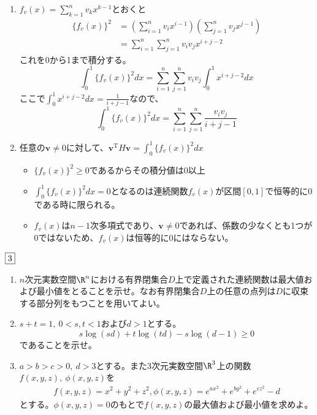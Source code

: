 \documentclass[dvipdfmx]{jsreport}
\begin{document}
\begin{souanswer}
\begin{enumerate}
	\item $f_v(x)= \sum_{k= 1}^n v_kx^{k- 1}$とおくと
\begin{align*}
	\{f_v(x)\}^2
	&= \left(\sum_{i= 1}^n v_ix^{i- 1}\right)\left(\sum_{j= 1}^n v_jx^{j- 1}\right)\\
	&= \sum_{i= 1}^n\sum_{j= 1}^n v_iv_j x^{i+ j- 2}
\end{align*}
	これを0から1まで積分する。
\begin{equation*}
	\int_0^1\{f_v(x)\}^2 dx= \sum_{i= 1}^n \sum_{j= 1}^n v_iv_j \int_0^1 x^{i+ j-2} dx
\end{equation*}
	ここで$\int_0^1 x^{i+ j- 2} dx= \frac{1}{i+ j- 1}$なので、
\begin{equation*}
	\int_0^1\{f_v(x)\}^2 dx= \sum_{i= 1}^n \sum_{j= 1}^n\frac{v_iv_j}{i+ j- 1}
\end{equation*}

	\item 任意の$\bm{v}\ne 0$に対して、$\bm{v}^\mathrm{T}H\bm{v}= \int_0^1 \{f_v(x)\}^2 dx$
\begin{itemize}
	\item $\{f_v(x)\}^2\ge 0$であるからその積分値は0以上
	\item  $\int_0^1 \{f_v(x)\}^2 dx= 0$となるのは連続関数$f_v(x)$が区間$[0, 1]$で恒等的に0である時に限られる。
	\item $f_v(x)$は$n- 1$次多項式であり、$\bm{v}\ne 0$であれば、係数の少なくとも1つが0ではないため、$f_v(x)$は恒等的に0にはならない。
\end{itemize}


\end{enumerate}
\end{souanswer}

\begin{tcolorbox} %
	$\fbox{3}$
\begin{enumerate}
	\item $n$次元実数空間$\R^n$における有界閉集合$D$上で定義された連続関数は最大値および最小値をとることを示せ。なお有界閉集合$D$上の任意の点列は$D$に収束する部分列をもつことを用いてよい。
	\item $s+ t= 1,\ 0< s, t< 1$および$d> 1$とする。
\begin{equation*}
	s\log{(sd)}+ t\log{(td)}- s\log{(d- 1)}\ge 0
\end{equation*}
	であることを示せ。

	\item $a> b> c> 0,\ d> 3$とする。また3次元実数空間$\R^3$上の関数$f(x, y, z),\ \phi(x, y, z)$を
\begin{align*}
	f(x, y, z)= x^2+ y^2+ z^2,
	\phi(x, y, z)= e^{ax^2}+ e^{by^2}+ e^{cz^2}- d
\end{align*}
	とする。$\phi(x, y, z)= 0$のもとで$f(x, y, z)$の最大値および最小値を求めよ。
\end{enumerate}
\end{tcolorbox}
\end{document}
